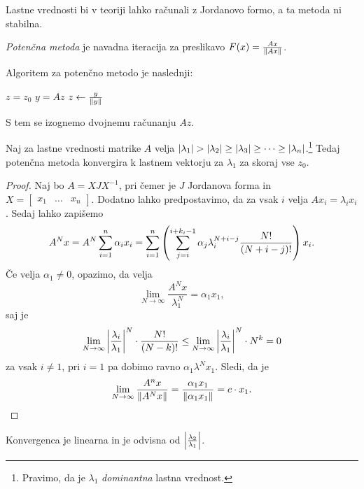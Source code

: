 \begin{opomba}
Lastne vrednosti bi v teoriji lahko računali z Jordanovo
formo, a ta metoda ni stabilna.
\end{opomba}

\begin{definicija}
\emph{Potenčna metoda} je navadna
iteracija za preslikavo $F(x) = \frac{Ax}{\left\lVert Ax\right\rVert}$.
\end{definicija}

\begin{opomba}
Algoritem za potenčno metodo je naslednji:

\begin{algorithmic}[1]
\State $z = z_0$
  \State $y = Az$
  \State $z \gets \frac{y}{\left\lVert y\right\rVert}$
\EndFor
\end{algorithmic}
S tem se izognemo dvojnemu računanju $Az$.
\end{opomba}

\begin{izrek}
Naj za lastne vrednosti matrike $A$ velja
$\left\lvert \lambda_1\right\rvert > \left\lvert \lambda_2\right\rvert \geq
\left\lvert \lambda_3\right\rvert \geq \dots \geq \left\lvert \lambda_n\right\rvert$.\footnote{Pravimo,
da je $\lambda_1$ \emph{dominantna} lastna vrednost.} Tedaj
potenčna metoda konvergira k lastnem vektorju za $\lambda_1$ za
skoraj vse $z_0$.
\end{izrek}

\begin{proof}
Naj bo $A = XJX^{-1}$, pri čemer je $J$ Jordanova forma in
$X = \begin{bmatrix}
x_1 & \dots & x_n
\end{bmatrix}$. Dodatno lahko predpostavimo, da za vsak $i$ velja
$Ax_i = \lambda_i x_i$. Sedaj lahko zapišemo
\[
A^N x = A^N \sum_{i=1}^n \alpha_i x_i =
\sum_{i=1}^n \left(\sum_{j=i}^{i+k_i-1}
\alpha_j \lambda_i^{N+i-j} \frac{N!}{(N+i-j)!}\right) x_i.
\]
Če velja $\alpha_1 \ne 0$, opazimo, da velja
\[
\lim_{N \to \infty} \frac{A^N x}{\lambda_1^N} = \alpha_1 x_1,
\]
saj je
\[
\lim_{N \to \infty} \left\lvert \frac{\lambda_i}{\lambda_1}\right\rvert^N \cdot
\frac{N!}{(N-k)!} \leq
\lim_{N \to \infty} \left\lvert \frac{\lambda_i}{\lambda_1}\right\rvert^N \cdot N^k =
0
\]
za vsak $i \ne 1$, pri $i = 1$ pa dobimo ravno
$\alpha_1 \lambda^N x_1$. Sledi, da je
\[
\lim_{N \to \infty} \frac{A^n x}{\left\lVert A^N x\right\rVert} =
\frac{\alpha_1 x_1}{\left\lVert \alpha_1 x_1\right\rVert} =
c \cdot x_1. \qedhere
\]
\end{proof}

\begin{opomba}
Konvergenca je linearna in je odvisna od
$\left\lvert \frac{\lambda_2}{\lambda_1}\right\rvert$.
\end{opomba}

